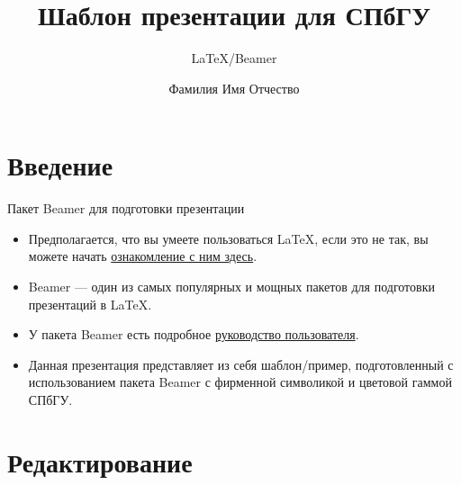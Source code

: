 \documentclass[10pt,aspectratio=169]{beamer}
\title{Шаблон презентации для СПбГУ}
\subtitle{\LaTeX/Beamer}
\author{Фамилия Имя Отчество}
\begin{document}
    \maketitle

    \section{Введение}

    \begin{frame}{Пакет Beamer для подготовки презентации}
        \begin{itemize}
            \item Предполагается, что вы умеете пользоваться \LaTeX, если это не так, вы можете начать
                \href{https://www.latex-project.org/}{ознакомление с ним здесь}.
            \item Beamer --- один из самых популярных и мощных пакетов для подготовки презентаций в \LaTeX.
            \item У пакета Beamer есть подробное
                \href{http://www.ctan.org/tex-archive/macros/latex/contrib/beamer/doc/beameruserguide.pdf}{руководство пользователя}.
            \item Данная презентация представляет из себя шаблон/пример, подготовленный с использованием пакета Beamer с фирменной символикой и цветовой гаммой СПбГУ.
        \end{itemize}
    \end{frame}

    \section{Редактирование}

\end{document}
